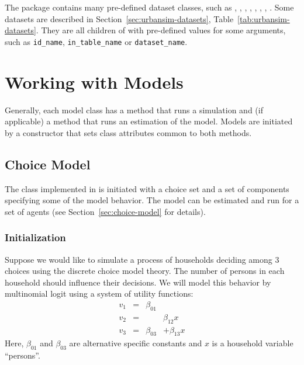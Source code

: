 The  package contains many pre-defined dataset classes, such as , ,
  , , , , ,
  . Some datasets are described in  Section~\ref{sec:urbansim-datasets},
  Table~\ref{tab:urbansim-datasets}. They are all children of  with pre-defined values
  for some arguments, such as \verb|id_name|, \verb|in_table_name| or \verb|dataset_name|. 

  

%
\section{Working with Models}
%
Generally, each model class has a method  that runs a simulation and
(if applicable) a method  that runs an estimation of the model.
Models are initiated by a constructor that sets class attributes common to
both methods.

%
\subsection{Choice Model}
%
The class  implemented in  is initiated with a choice set
and a set of components specifying some of the model behavior. The model can
be estimated and run for a set of agents (see Section~\ref{sec:choice-model} for details).

%
\subsubsection{Initialization}
%
Suppose we would like to simulate a process of households deciding among 3
choices using the discrete choice model theory. The number of persons in each
household should influence their decisions. We will model this behavior by
multinomial logit using a system of utility functions:
$$
\begin{array}{rcrr}
v_1 & = &\beta_{01} & \\
v_2 & = &  & \beta_{12}x \\
v_3 & = & \beta_{03} & +  \beta_{13}x
\end{array}
$$
Here, $\beta_{01}$ and $\beta_{03}$ are alternative specific constants and $x$
is a household variable ``persons''.

